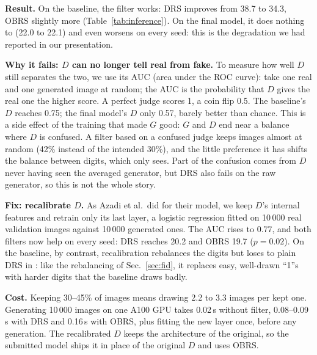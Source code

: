 \textbf{Result.} On the baseline, the filter works: DRS improves \finc{} from 38.7 to 34.3, OBRS slightly more
(Table~\ref{tab:inference}). On the final model, it does nothing to \finc{} (22.0 to 22.1) and even worsens \fcnn{} on
every seed: this is the degradation we had reported in our presentation.

\textbf{Why it fails: $D$ can no longer tell real from fake.} To measure how well $D$ still separates the two, we use its
AUC (area under the ROC curve): take one real and one generated image at random; the AUC is the probability that $D$ gives
the real one the higher score. A perfect judge scores 1, a coin flip 0.5. The baseline's $D$ reaches 0.75; the final
model's $D$ only 0.57, barely better than chance. This is a side effect of the training that made $G$ good: $G$ and $D$ end near a balance where $D$ is confused. A
filter based on a confused judge keeps images almost at random (42\% instead of the intended 30\%), and the little
preference it has shifts the balance between digits, which only \fcnn{} sees. Part of the confusion comes from $D$ never
having seen the averaged generator, but DRS also fails on the raw generator, so this is not the whole story.

\textbf{Fix: recalibrate $D$.} As Azadi et al.\ did for their model, we keep $D$'s internal features and retrain only its
last layer, a logistic regression fitted on 10\,000 real validation images against 10\,000 generated ones. The AUC rises
to 0.77, and both filters now help on every seed: DRS reaches 20.2 and OBRS 19.7 ($p=0.02$). On the baseline, by
contrast, recalibration rebalances the digits but loses to plain DRS in \finc{}: like the rebalancing of
Sec.~\ref{sec:fid}, it replaces easy, well-drawn ``1''s with harder digits that the baseline draws badly.

\textbf{Cost.} Keeping 30--45\% of images means drawing 2.2 to 3.3 images per kept one. Generating 10\,000 images on one
A100 GPU takes 0.02\,s without filter, 0.08--0.09\,s with DRS and 0.16\,s with OBRS, plus fitting the new layer once,
before any generation. The recalibrated $D$ keeps the architecture of the original, so the submitted model ships it in place of
the original $D$ and uses OBRS.

